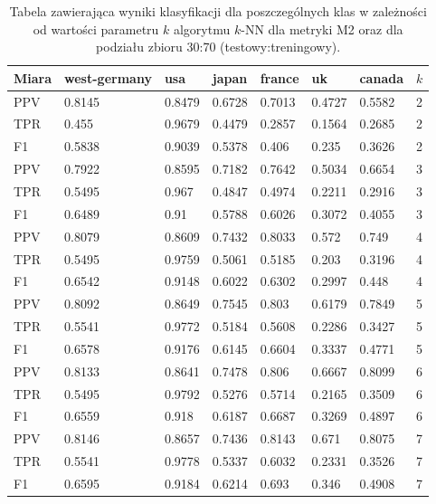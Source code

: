 \documentclass{classrep}
\begin{document}
\begin{table}[H]
    \centering
\caption{Tabela zawierająca wyniki klasyfikacji dla poszczególnych klas w zależności od wartości parametru \(k\) algorytmu \(k\)-NN dla metryki M2 oraz dla podziału zbioru 30:70 (testowy:treningowy).}
\begin{adjustbox}{max width=\textwidth}
    \begin{tabular}{|l|l|l|l|l|l|l|l|}
    \hline
        Miara & west-germany  & usa  & japan & france & uk & canada & \(k\) \\ \hline
        PPV & 0.8145 & 0.8479 & 0.6728 & 0.7013 & 0.4727 & 0.5582 & 2 \\ \hline
        TPR & 0.455 & 0.9679 & 0.4479 & 0.2857 & 0.1564 & 0.2685 & 2 \\ \hline
        F1 & 0.5838 & 0.9039 & 0.5378 & 0.406 & 0.235 & 0.3626 & 2 \\ \hline
        PPV & 0.7922 & 0.8595 & 0.7182 & 0.7642 & 0.5034 & 0.6654 & 3 \\ \hline
        TPR & 0.5495 & 0.967 & 0.4847 & 0.4974 & 0.2211 & 0.2916 & 3 \\ \hline
        F1 & 0.6489 & 0.91 & 0.5788 & 0.6026 & 0.3072 & 0.4055 & 3 \\ \hline
        PPV & 0.8079 & 0.8609 & 0.7432 & 0.8033 & 0.572 & 0.749 & 4 \\ \hline
        TPR & 0.5495 & 0.9759 & 0.5061 & 0.5185 & 0.203 & 0.3196 & 4 \\ \hline
        F1 & 0.6542 & 0.9148 & 0.6022 & 0.6302 & 0.2997 & 0.448 & 4 \\ \hline
        PPV & 0.8092 & 0.8649 & 0.7545 & 0.803 & 0.6179 & 0.7849 & 5 \\ \hline
        TPR & 0.5541 & 0.9772 & 0.5184 & 0.5608 & 0.2286 & 0.3427 & 5 \\ \hline
        F1 & 0.6578 & 0.9176 & 0.6145 & 0.6604 & 0.3337 & 0.4771 & 5 \\ \hline
        PPV & 0.8133 & 0.8641 & 0.7478 & 0.806 & 0.6667 & 0.8099 & 6 \\ \hline
        TPR & 0.5495 & 0.9792 & 0.5276 & 0.5714 & 0.2165 & 0.3509 & 6 \\ \hline
        F1 & 0.6559 & 0.918 & 0.6187 & 0.6687 & 0.3269 & 0.4897 & 6 \\ \hline
        PPV & 0.8146 & 0.8657 & 0.7436 & 0.8143 & 0.671 & 0.8075 & 7 \\ \hline
        TPR & 0.5541 & 0.9778 & 0.5337 & 0.6032 & 0.2331 & 0.3526 & 7 \\ \hline
        F1 & 0.6595 & 0.9184 & 0.6214 & 0.693 & 0.346 & 0.4908 & 7 \\ \hline

\end{tabular}
\end{adjustbox}
\end{table}
\end{document}
